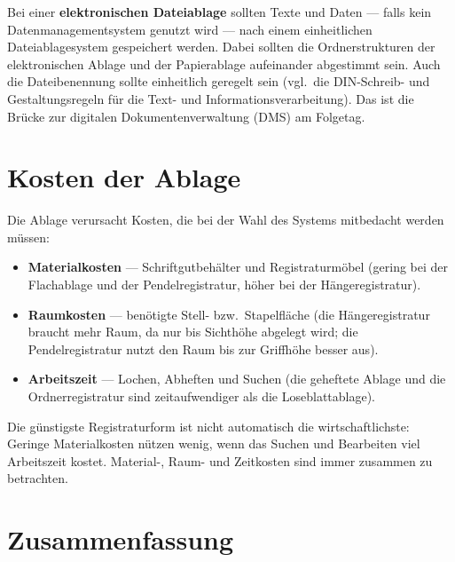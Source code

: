\documentclass[11pt, a4paper]{article}
\begin{document}
Bei einer \textbf{elektronischen Dateiablage} sollten Texte und Daten --- falls kein
Datenmanagementsystem genutzt wird --- nach einem einheitlichen Dateiablagesystem
gespeichert werden. Dabei sollten die Ordnerstrukturen der elektronischen Ablage und der
Papierablage aufeinander abgestimmt sein. Auch die Dateibenennung sollte einheitlich
geregelt sein (vgl.\ die DIN-Schreib- und Gestaltungsregeln für die Text- und
Informationsverarbeitung). Das ist die Brücke zur digitalen Dokumentenverwaltung (DMS)
am Folgetag.

\section{Kosten der Ablage}

Die Ablage verursacht Kosten, die bei der Wahl des Systems mitbedacht werden müssen:

\begin{itemize}
  \item \textbf{Materialkosten} --- Schriftgutbehälter und Registraturmöbel (gering bei
    der Flachablage und der Pendelregistratur, höher bei der Hängeregistratur).
  \item \textbf{Raumkosten} --- benötigte Stell- bzw.\ Stapelfläche (die
    Hängeregistratur braucht mehr Raum, da nur bis Sichthöhe abgelegt wird; die
    Pendelregistratur nutzt den Raum bis zur Griffhöhe besser aus).
  \item \textbf{Arbeitszeit} --- Lochen, Abheften und Suchen (die geheftete Ablage und
    die Ordnerregistratur sind zeitaufwendiger als die Loseblattablage).
\end{itemize}

\begin{merksatz}
Die günstigste Registraturform ist nicht automatisch die wirtschaftlichste: Geringe
Materialkosten nützen wenig, wenn das Suchen und Bearbeiten viel Arbeitszeit kostet.
Material-, Raum- und Zeitkosten sind immer zusammen zu betrachten.
\end{merksatz}

\section{Zusammenfassung}
\end{document}
